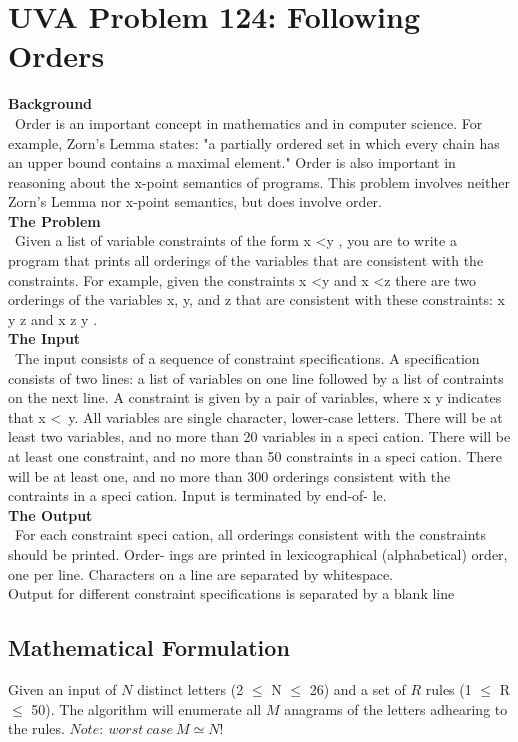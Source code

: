 \documentclass[12pt]{article}
\begin{document}
\section{UVA Problem 124: Following Orders}
\textbf{Background} \\
~\indent Order is an important concept in mathematics and in computer science. For example, Zorn's Lemma
states: "a partially ordered set in which every chain has an upper bound contains a maximal element."
Order is also important in reasoning about the x-point semantics of programs.
This problem involves neither Zorn's Lemma nor x-point semantics, but does involve order. \\
\textbf{The Problem} \\
~\indent Given a list of variable constraints of the form x \textless y , you are to write a program that prints all orderings
of the variables that are consistent with the constraints.
For example, given the constraints x \textless y and x \textless z there are two orderings of the variables x, y,
and z that are consistent with these constraints: x y z and x z y . \\
\textbf{The Input} \\
~\indent The input consists of a sequence of constraint specifications. A specification consists of two lines: a list
of variables on one line followed by a list of contraints on the next line. A constraint is given by a pair
of variables, where x y indicates that x \textless\ y.
All variables are single character, lower-case letters. There will be at least two variables, and no
more than 20 variables in a speci cation. There will be at least one constraint, and no more than 50
constraints in a speci cation. There will be at least one, and no more than 300 orderings consistent with
the contraints in a speci cation.
Input is terminated by end-of- le. \\
\textbf{The Output} \\
~\indent  For each constraint speci cation, all orderings consistent with the constraints should be printed. Order-
ings are printed in lexicographical (alphabetical) order, one per line. Characters on a line are separated
by whitespace.  \\
Output for different constraint specifications is separated by a blank line

\newpage

\subsection{Mathematical Formulation}
Given an input of $N$ distinct letters (2 $\leq$ N $\leq$ 26) and a set of $R$ rules (1 $\leq$ R $\leq$ 50). The algorithm will
enumerate all $M$ anagrams of the letters adhearing to the rules. $Note:\ worst\ case\ M \simeq N!$
\end{document}
